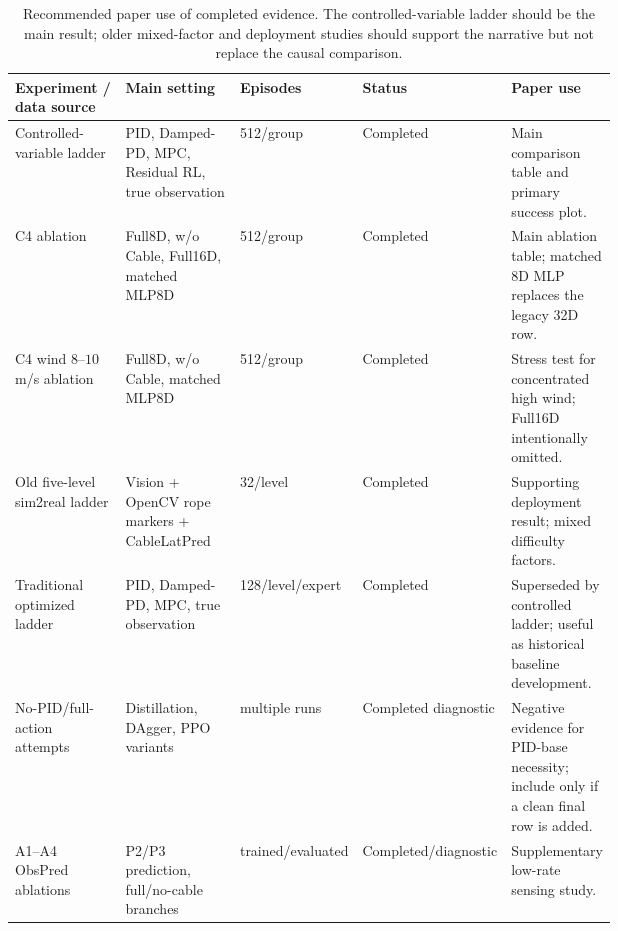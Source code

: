 \documentclass[10pt]{article}
\begin{document}
\begin{table}[t]
\centering
\caption{Recommended paper use of completed evidence.  The controlled-variable ladder should be the main result; older mixed-factor and deployment studies should support the narrative but not replace the causal comparison.}
\label{tab:completed_evidence}
\footnotesize
\begin{tabularx}{\linewidth}{@{}p{0.22\linewidth}p{0.23\linewidth}p{0.12\linewidth}p{0.13\linewidth}Y@{}}
\toprule
Experiment / data source & Main setting & Episodes & Status & Paper use \\
\midrule
Controlled-variable ladder & PID, Damped-PD, MPC, Residual RL, true observation & 512/group & Completed & Main comparison table and primary success plot. \\
C4 ablation & Full8D, w/o Cable, Full16D, matched MLP8D & 512/group & Completed & Main ablation table; matched 8D MLP replaces the legacy 32D row. \\
C4 wind $8$--$10$ m/s ablation & Full8D, w/o Cable, matched MLP8D & 512/group & Completed & Stress test for concentrated high wind; Full16D intentionally omitted. \\
Old five-level sim2real ladder & Vision + OpenCV rope markers + CableLatPred & 32/level & Completed & Supporting deployment result; mixed difficulty factors. \\
Traditional optimized ladder & PID, Damped-PD, MPC, true observation & 128/level/expert & Completed & Superseded by controlled ladder; useful as historical baseline development. \\
No-PID/full-action attempts & Distillation, DAgger, PPO variants & multiple runs & Completed diagnostic & Negative evidence for PID-base necessity; include only if a clean final row is added. \\
A1--A4 ObsPred ablations & P2/P3 prediction, full/no-cable branches & trained/evaluated & Completed/diagnostic & Supplementary low-rate sensing study. \\
\bottomrule
\end{tabularx}
\end{table}
\end{document}
